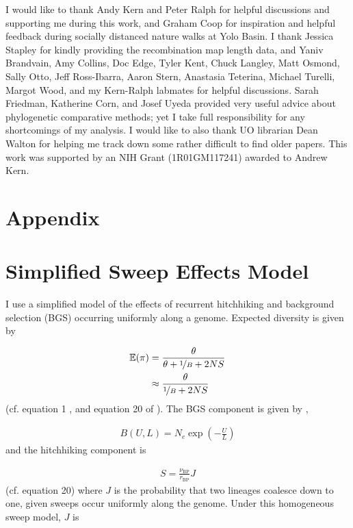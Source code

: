 \documentclass[11pt]{article}
\newcommand{\E}{\mathbb{E}}
\begin{document}
I would like to thank Andy Kern and Peter Ralph for helpful discussions and
supporting me during this work, and Graham Coop for inspiration and helpful
feedback during socially distanced nature walks at Yolo Basin. I thank Jessica
Stapley for kindly providing the recombination map length data, and Yaniv
Brandvain, Amy Collins, Doc Edge, Tyler Kent, Chuck Langley, Matt Osmond, Sally
Otto, Jeff Ross-Ibarra, Aaron Stern, Anastasia Teterina, Michael Turelli,
Margot Wood, and my Kern-Ralph labmates for helpful discussions. Sarah
Friedman, Katherine Corn, and Josef Uyeda provided very useful advice about
phylogenetic comparative methods; yet I take full responsibility for any
shortcomings of my analysis.  I would like to also thank UO librarian Dean
Walton for helping me track down some rather difficult to find older papers.
This work was supported by an NIH Grant (1R01GM117241) awarded to Andrew Kern.

\section*{Appendix}

\setcounter{table}{0}
\renewcommand{\theequation}{A\arabic{equation}}
\setcounter{section}{0}
\renewcommand{\thesection}{A\arabic{section}}
\setcounter{figure}{0}
\renewcommand{\thefigure}{A\arabic{figure}}


\section{Simplified Sweep Effects Model}
\label{app:sweep}

I use a simplified model of the effects of recurrent hitchhiking and background
selection (BGS) occurring uniformly along a genome. Expected diversity is given
by

\begin{align}
  \E(\pi) &= \frac{\theta}{\theta + \nicefrac{1}{B} + 2NS} \\
          &\approx \frac{\theta}{\nicefrac{1}{B} + 2NS} 
\end{align}
%
(cf. equation 1 \cite{Elyashiv2016-vt}, and equation 20 of \cite{Coop2012-cd}).
The BGS component is given by \textcite{Hudson1995-xc},

\begin{align}
  B(U, L) = N_e \exp\left(-\frac{U}{L}\right)
\end{align}
%
and the hitchhiking component is

\begin{align}
  S = \frac{\nu_\text{BP}}{r_\text{BP}} J
\end{align}
%
(cf. \cite{Coop2012-cd} equation 20) where $J$ is the probability that two
lineages coalesce down to one, given sweeps occur uniformly along the genome.
Under this homogeneous sweep model, $J$ is 
\end{document}

